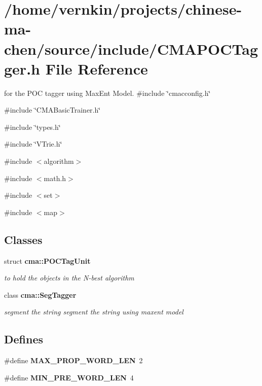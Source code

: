 \section{/home/vernkin/projects/chinese-\/ma-\/chen/source/include/CMAPOCTagger.h File Reference}
\label{CMAPOCTagger_8h}


for the POC tagger using MaxEnt Model.  
{\ttfamily \#include \char`\"{}cmacconfig.h\char`\"{}}\par
{\ttfamily \#include \char`\"{}CMABasicTrainer.h\char`\"{}}\par
{\ttfamily \#include \char`\"{}types.h\char`\"{}}\par
{\ttfamily \#include \char`\"{}VTrie.h\char`\"{}}\par
{\ttfamily \#include $<$algorithm$>$}\par
{\ttfamily \#include $<$math.h$>$}\par
{\ttfamily \#include $<$set$>$}\par
{\ttfamily \#include $<$map$>$}\par
\subsection*{Classes}
\begin{DoxyCompactItemize}
\item 
struct {\bf cma::POCTagUnit}
\begin{DoxyCompactList}\small\item\em to hold the objects in the N-\/best algorithm \item\end{DoxyCompactList}\item 
class {\bf cma::SegTagger}
\begin{DoxyCompactList}\small\item\em segment the string segment the string using maxent model \item\end{DoxyCompactList}\end{DoxyCompactItemize}
\subsection*{Defines}
\begin{DoxyCompactItemize}
\item 
\#define {\bf MAX\_\-PROP\_\-WORD\_\-LEN}~2
\item 
\#define {\bf MIN\_\-PRE\_\-WORD\_\-LEN}~4
\end{DoxyCompactItemize}
